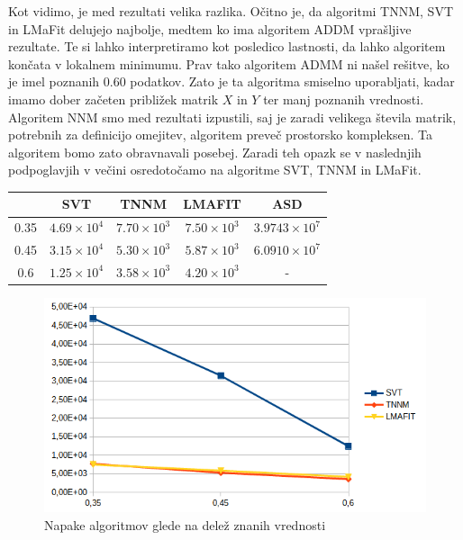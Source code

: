 Kot vidimo, je med rezultati velika razlika. Očitno je, da algoritmi TNNM, SVT in LMaFit delujejo najbolje, medtem ko ima algoritem ADDM vprašljive rezultate. Te si lahko interpretiramo kot posledico lastnosti, da lahko algoritem končata v lokalnem minimumu. Prav tako algoritem ADMM ni našel rešitve, ko je imel poznanih $0.60$ podatkov. Zato je ta algoritma smiselno uporabljati, kadar imamo dober začeten približek matrik $X$ in $Y$ ter manj poznanih vrednosti. Algoritem NNM smo med rezultati izpustili, saj je zaradi velikega števila matrik, potrebnih za definicijo omejitev, algoritem preveč prostorsko kompleksen. Ta algoritem bomo zato obravnavali posebej. Zaradi teh opazk se v naslednjih podpoglavjih v večini osredotočamo na algoritme SVT, TNNM in LMaFit.
\begin{table}[h]
    \centering
    \begin{tabular}{|c|c|c|c|c|}
    \hline
    & SVT & TNNM & LMAFIT & ASD \\ \hline
    0.35 & $4.69 \times 10^4$ & $7.70 \times 10^3$ & $7.50 \times 10^3$ & $3.9743 \times 10^7$ \\ \hline
    0.45 & $3.15 \times 10^4$ & $5.30 \times 10^3$ & $5.87 \times 10^3$ & $6.0910 \times 10^7$ \\ \hline
    0.6 & $1.25 \times 10^4$ & $3.58 \times 10^3$ & $4.20 \times 10^3$ & - \\ \hline
    \end{tabular}
\end{table}
\begin{figure}[!ht]
    \centering
    \includegraphics[width=\linewidth]{Poglavja/Slike/grayscale1000/grafNapake.png}
    \caption{Napake algoritmov glede na delež znanih vrednosti}
\end{figure}

